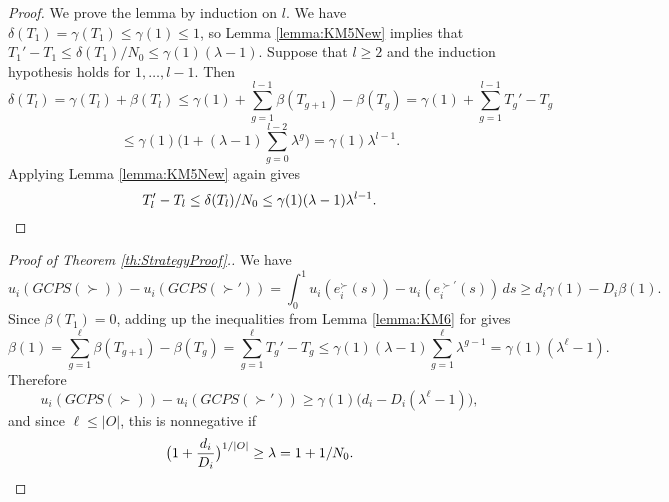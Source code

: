 \documentclass[12pt, A4paper]{article}
\theoremstyle{definition}
\begin{document}
\begin{appendix}
\begin{proof}
  We prove the lemma by induction on $l$.  We have $\delta(T_1) = \gamma(T_1) \le \gamma(1) \le 1$, so Lemma \ref{lemma:KM5New} implies that $T_1' - T_1 \le \delta(T_1) /N_0 \le \gamma(1)(\lambda - 1)$. 
  Suppose that $l \ge 2$ and the induction hypothesis holds for $1, \ldots, l - 1$.  Then
  $$\delta(T_l) = \gamma(T_l) + \beta(T_l) \le \gamma(1) + \sum_{g = 1}^{l-1} \beta(T_{g+1}) - \beta(T_g) = \gamma(1) + \sum_{g = 1}^{l-1} T_g' - T_g$$
  $$\le \gamma(1)\Big(1 + (\lambda - 1)\sum_{g = 0}^{l-2}\lambda^g\Big) = \gamma(1)\lambda^{l-1}.$$
  Applying Lemma \ref{lemma:KM5New} again gives
  \begin{equation*}
  T_l' - T_l \le \delta(T_l)/N_0 \le \gamma(1)(\lambda - 1)\lambda^{l-1}. \qedhere
  \end{equation*}
\end{proof}

\begin{proof}[Proof of Theorem \ref{th:StrategyProof}.]
  We have
  $$u_i(GCPS(\succ)) - u_i(GCPS(\succ')) = \int_0^1 u_i(e_i^\succ(s)) - u_i(e_i^{\succ'}(s)) \, ds \ge d_i\gamma(1) - D_i\beta(1).$$
  Since $\beta(T_1) = 0$, adding up the inequalities from Lemma \ref{lemma:KM6} for gives
  $$\beta(1) = \sum_{g = 1}^{\ell} \beta(T_{g+1}) - \beta(T_g) = \sum_{g = 1}^{\ell} T_g' - T_g \le \gamma(1)(\lambda - 1)
  \sum_{g = 1}^{\ell}\lambda^{g-1} = \gamma(1)(\lambda^{\ell} - 1).$$ 
  Therefore
  $$u_i(GCPS(\succ)) - u_i(GCPS(\succ')) \ge \gamma(1)\big(d_i - D_i(\lambda^{\ell} - 1)\big),$$
  and since $\ell \le |O|$, this is nonnegative if
  \begin{equation*}
  \big(1 + \frac{d_i}{D_i}\big)^{1/|O|} \ge \lambda = 1 + 1/N_0. \qedhere
  \end{equation*}
\end{proof}

\end{appendix}

\end{document}
